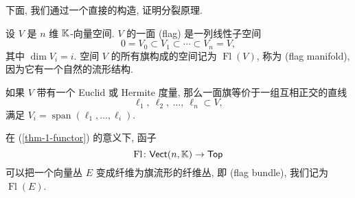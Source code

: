 下面, 我们通过一个直接的构造, 证明分裂原理.

\begin{definition}
    设 $V$ 是 $n$ 维 $\mathbb{K}$-向量空间. $V$ 的一面 (flag) 是一列线性子空间
    \[ 0 = V_0 \subset V_1 \subset \cdots \subset V_n = V, \]
    其中 $\dim V_i = i$. 空间 $V$ 的所有旗构成的空间记为 $\operatorname{Fl}(V)$,
    称为 (flag manifold), 因为它有一个自然的流形结构.
\end{definition}

如果 $V$ 带有一个 Euclid 或 Hermite 度量, 
那么一面旗等价于一组互相正交的直线
\[ \ell_1,\ \ell_2,\ \dotsc,\ \ell_n \subset V, \]
满足 $V_i = \operatorname{span}(\ell_1, \dotsc, \ell_i)$.

在 (\ref{thm-1-functor}) 的意义下, 函子
\[ \operatorname{Fl} \colon \textsf{Vect}(n,\mathbb{K}) \to \textsf{Top} \]
可以把一个向量丛 $E$
变成纤维为旗流形的纤维丛, 即 (flag bundle),
我们记为 $\operatorname{Fl}(E)$.

